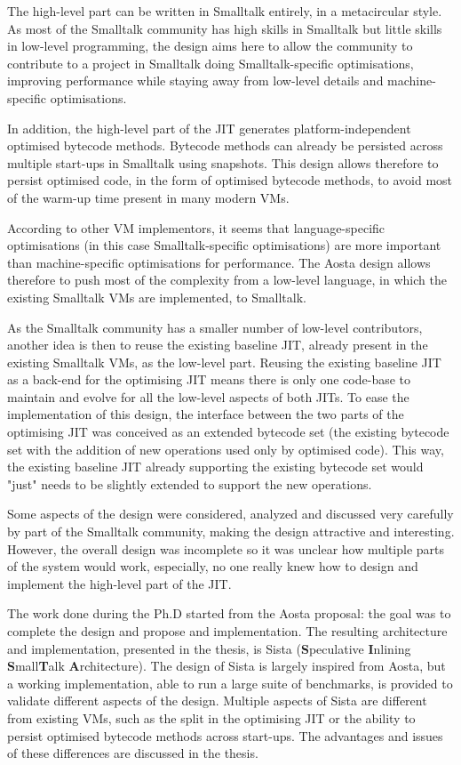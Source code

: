 \documentclass[a4paper,12pt,twoside]{../includes/ThesisStyle}
\begin{document}
The high-level part can be written in Smalltalk entirely, in a metacircular style. As most of the Smalltalk community has high skills in Smalltalk but little skills in low-level programming, the design aims here to allow the community to contribute to a project in Smalltalk doing Smalltalk-specific optimisations, improving performance while staying away from low-level details and machine-specific optimisations. 

In addition, the high-level part of the JIT generates platform-independent optimised bytecode methods. Bytecode methods can already be persisted across multiple start-ups in Smalltalk using snapshots. This design allows therefore to persist optimised code, in the form of optimised bytecode methods, to avoid most of the warm-up time present in many modern VMs.

According to other VM implementors, it seems that language-specific optimisations (in this case Smalltalk-specific optimisations) are more important than machine-specific optimisations for performance. The Aosta design allows therefore to push most of the complexity from a low-level language, in which the existing Smalltalk VMs are implemented, to Smalltalk.

As the Smalltalk community has a smaller number of low-level contributors, another idea is then to reuse the existing baseline JIT, already present in the existing Smalltalk VMs, as the low-level part. Reusing the existing baseline JIT as a back-end for the optimising JIT means there is only one code-base to maintain and evolve for all the low-level aspects of both JITs. To ease the implementation of this design, the interface between the two parts of the optimising JIT was conceived as an extended bytecode set (the existing bytecode set with the addition of new operations used only by optimised code). This way, the existing baseline JIT already supporting the existing bytecode set would "just" needs to be slightly extended to support the new operations.

Some aspects of the design were considered, analyzed and discussed very carefully by part of the Smalltalk community, making the design attractive and interesting. However, the overall design was incomplete so it was unclear how multiple parts of the system would work, especially, no one really knew how to design and implement the high-level part of the JIT.

The work done during the Ph.D started from the Aosta proposal: the goal was to complete the design and propose and implementation. The resulting architecture and implementation, presented in the thesis, is Sista (\textbf{S}peculative \textbf{I}nlining \textbf{S}mall\textbf{T}alk \textbf{A}rchitecture). The design of Sista is largely inspired from Aosta, but a working implementation, able to run a large suite of benchmarks, is provided to validate different aspects of the design. Multiple aspects of Sista are different from existing VMs, such as the split in the optimising JIT or the ability to persist optimised bytecode methods across start-ups. The advantages and issues of these differences are discussed in the thesis.
\end{document}

